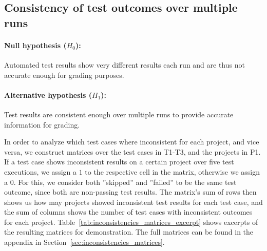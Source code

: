 \subsection{Consistency of test outcomes over multiple runs}

\paragraph{Null hypothesis ($H_0$):}
Automated test results show very different results each run and are thus not accurate enough for grading purposes.
\vspace{-\medskipamount}
\paragraph{Alternative hypothesis ($H_1$):}
Test results are consistent enough over multiple runs to provide accurate information for grading.
\parspace

In order to analyze which test cases where inconsistent for each project, and vice versa,
we construct matrices over the test cases in T1-T3, and the projects in P1.
If a test case shows inconsistent results on a certain project over five test executions,
we assign a $1$ to the respective cell in the matrix, otherwise we assign a 0.
For this, we consider both ''skipped'' and ''failed'' to be the same test outcome, since both are non-passing test results.
The matrix's sum of rows then shows us how may projects showed inconsistent test results for each test case,
and the sum of columns shows the number of test cases with inconsistent outcomes for each project.
Table~\ref{tab:inconsistencies_matrices_excerpt} shows excerpts of the resulting matrices for demonstration.
The full matrices can be found in the appendix in Section~\ref{sec:inconsistencies_matrices}.
\parspace

